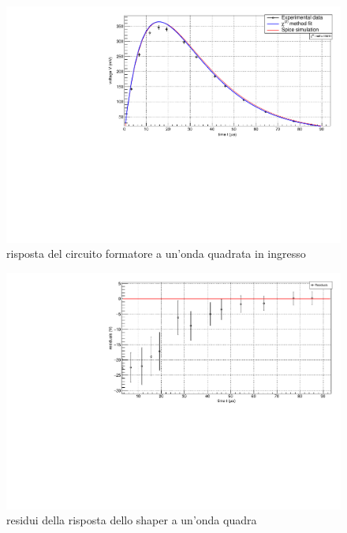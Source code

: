 \documentclass{article}
\begin{document}
\begin{center}
    \begin{figure}[H]
    \centering
    \includegraphics[scale=0.375, angle=0]{forma_no_pz.pdf}
    \caption{risposta del circuito formatore a un'onda quadrata in ingresso}
    \label{fig:forma_no_pz}
    \end{figure}
\end{center}

\begin{center}
    \begin{figure}[H]
    \centering
    \includegraphics[scale=0.375, angle=0]{residui_forma_onda_no_pz.pdf}
    \caption{residui della risposta dello shaper a un'onda quadra}
    \label{fig:forma_no_pz_residui}
    \end{figure}
\end{center}
\end{document}
